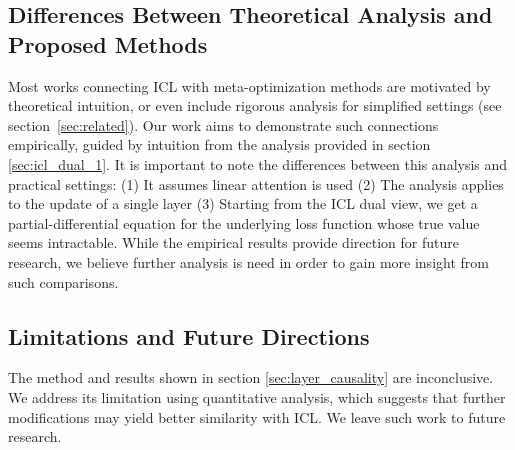 \subsection{Differences Between Theoretical Analysis and Proposed Methods}
Most works connecting ICL with meta-optimization methods are motivated by theoretical intuition, or even include rigorous analysis for simplified settings \cite{pmlr-v202-von-oswald23a, akyürek2023learning} (see section~\ref{sec:related}).
Our work aims to demonstrate such connections empirically, guided by intuition from the analysis provided in section \ref{sec:icl_dual_1}.  
It is important to note the differences between this analysis and practical settings: (1) It assumes linear attention is used (2) The analysis applies to the update of a single layer
(3) Starting from the ICL dual view, we get a partial-differential equation for the underlying loss function whose true value seems intractable.
While the empirical results provide direction for future research, we believe further analysis is need in order to gain more insight from such comparisons. 

\subsection{Limitations and Future Directions}
The method and results shown in section \ref{sec:layer_causality} are inconclusive.
We address its limitation using quantitative analysis, which suggests that further modifications may yield better similarity with ICL.
We leave such work to future research.  